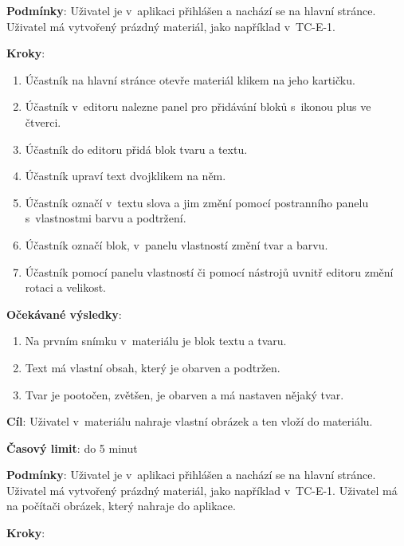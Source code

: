 \textbf{Podmínky}:  Uživatel je v~aplikaci přihlášen a nachází se na hlavní stránce. Uživatel má vytvořený prázdný materiál, jako například v~TC-E-1.

\vspace{1em}
\textbf{Kroky}:

\begin{enumerate}[leftmargin=1.4cm]
    \item Účastník na hlavní stránce otevře materiál klikem na jeho kartičku.
    \item Účastník v~editoru nalezne panel pro přidávání bloků s~ikonou plus ve čtverci.
    \item Účastník do editoru přidá blok tvaru a textu.
    \item Účastník upraví text dvojklikem na něm.
    \item Účastník označí v~textu slova a jim změní pomocí postranního panelu s~vlastnostmi barvu a podtržení.
    \item Účastník označí blok, v~panelu vlastností změní tvar a barvu.
    \item Účastník pomocí panelu vlastností či pomocí nástrojů uvnitř editoru změní rotaci a velikost.
\end{enumerate}

\textbf{Očekávané výsledky}:

\begin{enumerate}[leftmargin=1.4cm]
    \item Na prvním snímku v~materiálu je blok textu a tvaru.
    \item Text má vlastní obsah, který je obarven a podtržen.
    \item Tvar je pootočen, zvětšen, je obarven a má nastaven nějaký tvar. 
\end{enumerate}






\vspace{1em}

\textbf{Cíl}: Uživatel v~materiálu nahraje vlastní obrázek a ten vloží do materiálu.

\textbf{Časový limit}: do 5 minut

\textbf{Podmínky}:  Uživatel je v~aplikaci přihlášen a nachází se na hlavní stránce. Uživatel má vytvořený prázdný materiál, jako například v~TC-E-1. Uživatel má na počítači obrázek, který nahraje do aplikace.

\textbf{Kroky}:

